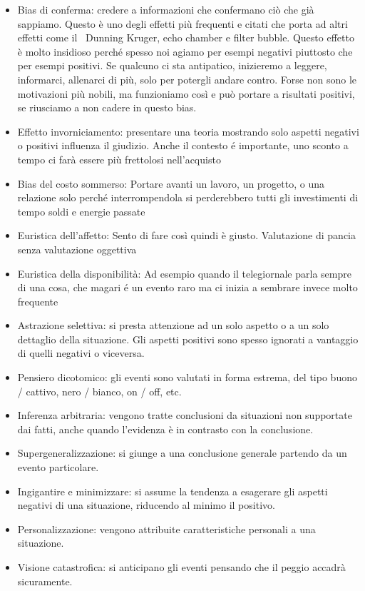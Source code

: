 \documentclass[12pt]{book} %
\begin{document}
\begin{itemize}
\item Bias di conferma: credere a informazioni che confermano ciò che già sappiamo. Questo è uno degli effetti più
frequenti e citati che porta ad altri effetti come il \ Dunning Kruger, echo chamber e filter bubble. Questo effetto è
molto insidioso perché spesso noi agiamo per esempi negativi piuttosto che per esempi positivi. Se qualcuno ci sta
antipatico, inizieremo a leggere, informarci, allenarci di più, solo per potergli andare contro. Forse non sono le
motivazioni più nobili, ma funzioniamo così e può portare a risultati positivi, se riusciamo a non cadere in questo
bias.
\item Effetto invorniciamento: presentare una teoria mostrando solo aspetti negativi o positivi influenza il giudizio.
Anche il contesto é importante, uno sconto a tempo ci farà essere più frettolosi nell'acquisto 
\item Bias del costo sommerso: Portare avanti un lavoro, un progetto, o una relazione solo perché interrompendola si
perderebbero tutti gli investimenti di tempo soldi e energie passate
\item Euristica dell'affetto: Sento di fare così quindi è giusto. Valutazione di pancia senza valutazione oggettiva 
\item Euristica della disponibilità: Ad esempio quando il telegiornale parla sempre di una cosa, che magari é un evento
raro ma ci inizia a sembrare invece molto frequente 
\item Astrazione selettiva: si presta attenzione ad un solo aspetto o a un solo dettaglio della situazione. Gli aspetti
positivi sono spesso ignorati a vantaggio di quelli negativi o viceversa.
\item Pensiero dicotomico: gli eventi sono valutati in forma estrema, del tipo buono / cattivo, nero / bianco, on / off,
etc.
\item Inferenza arbitraria: vengono tratte conclusioni da situazioni non supportate dai fatti, anche quando
l'evidenza è in contrasto con la conclusione.
\item Supergeneralizzazione: si giunge a una conclusione generale partendo da un evento particolare.
\item Ingigantire e minimizzare: si assume la tendenza a esagerare gli aspetti negativi di una situazione, riducendo al
minimo il positivo.
\item Personalizzazione: vengono attribuite caratteristiche personali a una situazione.
\item Visione catastrofica: si anticipano gli eventi pensando che il peggio accadrà sicuramente.

\end{itemize}
\end{document}
